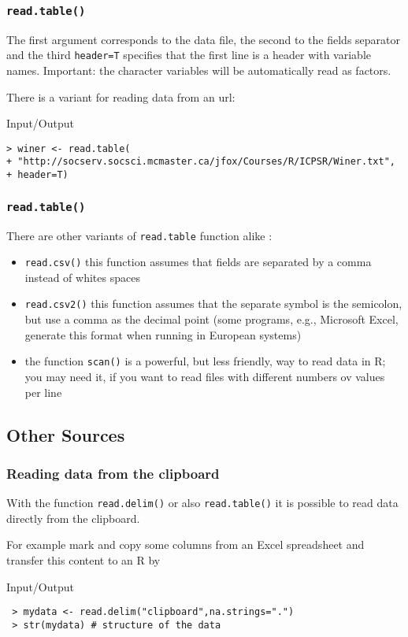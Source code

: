 \documentclass[xcolor={table},c]{beamer}
\begin{document}
\begin{frame}[fragile]\frametitle{\texttt{read.table()}}
 The first argument corresponds to the data file, the second to the fields separator  and the third \texttt{header=T} specifies that the first line is a header with variable names. Important: the character variables will be automatically read as factors.

There is a variant for reading data from an url:
\begin{exampleblock}{Input/Output}\footnotesize
\begin{verbatim}
> winer <- read.table( 
+ "http://socserv.socsci.mcmaster.ca/jfox/Courses/R/ICPSR/Winer.txt",
+ header=T)
\end{verbatim}
\end{exampleblock}
\end{frame}

\begin{frame}[fragile]\frametitle{\texttt{read.table()}}
There are other variants of \texttt{read.table} function alike :
\begin{itemize}
\item \texttt{read.csv()} this function assumes that fields are separated by a comma instead of whites spaces
\item \texttt{read.csv2()} this function assumes that the separate symbol is the semicolon, but use a comma as the decimal point (some programs, e.g., Microsoft Excel, generate this format when running in European systems)
\item the function \texttt{scan()} is a powerful, but less friendly, way to read data in R; you may need it, if you want to read files with different numbers ov values per line
\end{itemize}
\end{frame}

\subsection{Other Sources}

\begin{frame}[fragile]\frametitle{Reading data from the clipboard}
With the function \texttt{read.delim()} or also \texttt{read.table()} it is possible to read data directly from the clipboard.

For example mark and copy some columns from an Excel spreadsheet and transfer this content to an R
by
\begin{exampleblock}{Input/Output}
\begin{verbatim}
 > mydata <- read.delim("clipboard",na.strings=".")
 > str(mydata) # structure of the data
\end{verbatim}
\end{exampleblock}
\end{frame}
\end{document}
